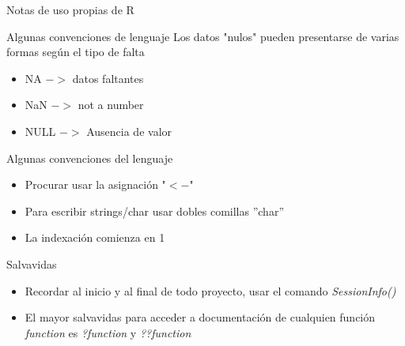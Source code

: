 \documentclass[aspectratio=169,xcolor=dvipsnames]{beamer}
\begin{document}
\begin{section}{Notas de uso propias de R}
\begin{frame}{Algunas convenciones de lenguaje}
    Los datos "nulos" pueden presentarse de varias formas según el tipo de falta
    \begin{itemize}
        \item NA   $->$ datos faltantes
        \item NaN  $->$ not a number
        \item NULL $->$ Ausencia de valor
    \end{itemize}
\end{frame}

\begin{frame}{Algunas convenciones del lenguaje}
    \begin{itemize}
        \item Procurar usar la asignación "$<-$"
        \item Para escribir strings/char usar dobles comillas ''char''
        \item La indexación comienza en 1
    \end{itemize}  
\end{frame}

\begin{frame}{Salvavidas}
    \begin{itemize}
        \item Recordar al inicio y al final de todo proyecto, usar el comando \textit{SessionInfo()}
        \item El mayor salvavidas para acceder a documentación de cualquien función \textit{function} es \textit{?function} y \textit{??function}
    \end{itemize}

\end{frame}

\end{section}
\end{document}
